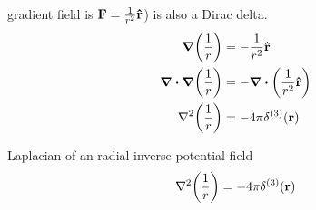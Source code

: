 		gradient field is $\vb{F} = \frac{1}{r^2}\vu{r}$) is also a Dirac delta.
		\begin{align*}
			\grad\qty(\frac{1}{r}) &= - \frac{1}{r^2}\vu{r}\\
			\div\grad\qty(\frac{1}{r}) &= - \div\qty(\frac{1}{r^2}\vu{r})\\
			\lpc\qty(\frac{1}{r}) &= - 4\pi\delta^{(3)}(\vb r)
		\end{align*}
		\begin{theorem}{Laplacian of an radial inverse potential field}
			\begin{equation}
				\lpc(\frac{1}{r}) = -4\pi\delta^{(3)}(\vb{r})
			\end{equation}
		\end{theorem}
			
			
			
\newpage





















